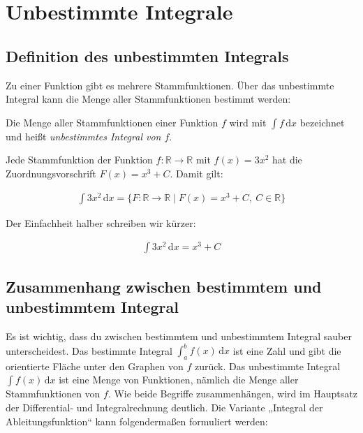 \documentclass[fontsize=9pt,
               parskip=half-,
               DIV=14,
               listof=chapterentry,
               tocflat]{scrbook}
\begin{document}
\section{Unbestimmte Integrale}

\subsection{Definition des unbestimmten Integrals}

Zu einer Funktion gibt es mehrere Stammfunktionen. Über das unbestimmte Integral kann die Menge aller Stammfunktionen bestimmt werden:

\begin{definition*}
Die Menge aller Stammfunktionen einer Funktion $f$ wird mit $\int f\,\mathrm {d} x$ bezeichnet und heißt \emph{unbestimmtes Integral von $f$}.

\end{definition*}

\begin{example*}
Jede Stammfunktion der Funktion $f:\mathbb {R} \to \mathbb {R} $ mit $f(x)=3x^{2}$ hat die Zuordnungsvorschrift $F(x)=x^{3}+C$. Damit gilt:

\begin{align*}
\int 3x^{2}\,\mathrm {d} x=\{F:\mathbb {R} \to \mathbb {R} \mid F(x)=x^{3}+C,\ C\in \mathbb {R} \}
\end{align*}

Der Einfachheit halber schreiben wir kürzer:

\begin{align*}
\int 3x^{2}\,\mathrm {d} x=x^{3}+C
\end{align*}

\end{example*}

\subsection{Zusammenhang zwischen bestimmtem und unbestimmtem Integral}

Es ist wichtig, dass du zwischen bestimmtem und unbestimmtem Integral sauber unterscheidest. Das bestimmte Integral $\int _{a}^{b}f(x)\,\mathrm {d} x$ ist eine Zahl und gibt die orientierte Fläche unter den Graphen von $f$ zurück. Das unbestimmte Integral $\int f(x)\,\mathrm {d} x$ ist eine Menge von Funktionen, nämlich die Menge aller Stammfunktionen von $f$. Wie beide Begriffe zusammenhängen, wird im Hauptsatz der Differential- und Integralrechnung deutlich. Die Variante „Integral der Ableitungsfunktion“ kann folgendermaßen formuliert werden:
\end{document}
